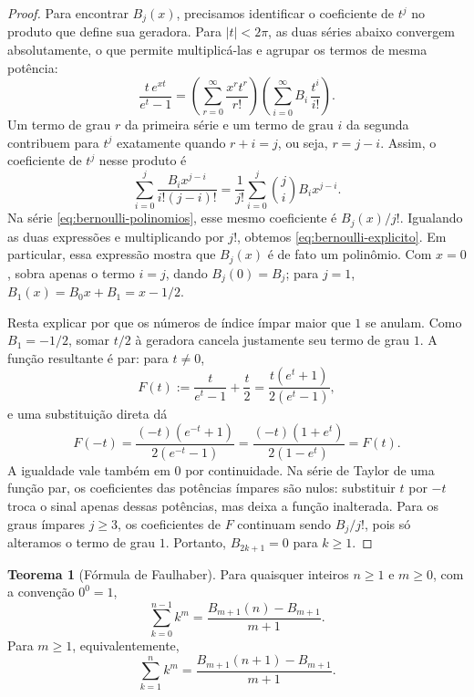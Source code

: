 \documentclass[12pt,portuguese]{article}
\theoremstyle{definition}
\newtheorem{theorem}{Teorema}
\theoremstyle{plainexercise}
\theoremstyle{starredexercise}
\theoremstyle{definition}
\begin{document}
\begin{proof}
Para encontrar $B_j(x)$, precisamos identificar o coeficiente de $t^j$
no produto que define sua geradora. Para $|t|<2\pi$, as duas séries
abaixo convergem absolutamente, o que permite multiplicá-las e agrupar
os termos de mesma potência:
\[
\frac{t\,e^{xt}}{e^{t}-1}
=\left(\sum_{r=0}^{\infty}\frac{x^{r}t^{r}}{r!}\right)
\left(\sum_{i=0}^{\infty}B_i\,\frac{t^{i}}{i!}\right).
\]
Um termo de grau $r$ da primeira série e um termo de grau $i$ da
segunda contribuem para $t^j$ exatamente quando $r+i=j$, ou seja,
$r=j-i$. Assim, o coeficiente de $t^j$ nesse produto é
\[
\sum_{i=0}^{j}\frac{B_i x^{j-i}}{i!(j-i)!}
=\frac1{j!}\sum_{i=0}^{j}\binom{j}{i} B_i x^{j-i}.
\]
Na série \eqref{eq:bernoulli-polinomios}, esse mesmo coeficiente é
$B_j(x)/j!$. Igualando as duas expressões e multiplicando por $j!$,
obtemos \eqref{eq:bernoulli-explicito}. Em particular, essa expressão
mostra que $B_j(x)$ é de fato um polinômio. Com $x=0$, sobra apenas
o termo $i=j$, dando $B_j(0)=B_j$; para $j=1$,
$B_1(x)=B_0x+B_1=x-1/2$.

Resta explicar por que os números de índice ímpar maior que $1$ se
anulam. Como $B_1=-1/2$, somar $t/2$ à geradora cancela justamente
seu termo de grau $1$. A função resultante é par: para $t\neq0$,
\[
F(t):=\frac{t}{e^t-1}+\frac{t}{2}
=\frac{t(e^t+1)}{2(e^t-1)},
\]
e uma substituição direta dá
\[
F(-t)=\frac{(-t)(e^{-t}+1)}{2(e^{-t}-1)}
=\frac{(-t)(1+e^t)}{2(1-e^t)}=F(t).
\]
A igualdade vale também em $0$ por continuidade. Na série de Taylor de
uma função par, os coeficientes das potências ímpares são nulos:
substituir $t$ por $-t$ troca o sinal apenas dessas potências, mas
deixa a função inalterada. Para os graus ímpares $j\geqslant3$, os
coeficientes de $F$ continuam sendo $B_j/j!$, pois só alteramos o
termo de grau $1$. Portanto, $B_{2k+1}=0$ para $k\geqslant1$.
\end{proof}

\begin{theorem}[Fórmula de Faulhaber]\label{thm:faulhaber}
Para quaisquer inteiros $n\geqslant1$ e $m\geqslant0$, com a convenção
$0^{0}=1$,
\begin{equation}\label{eq:faulhaber}
\sum_{k=0}^{n-1}k^{m}
=\frac{B_{m+1}(n)-B_{m+1}}{m+1}.
\end{equation}
Para $m\geqslant1$, equivalentemente,
\begin{equation}\label{eq:faulhaber-1a-n}
\sum_{k=1}^{n}k^{m}
=\frac{B_{m+1}(n+1)-B_{m+1}}{m+1}.
\end{equation}
\end{theorem}
\end{document}
